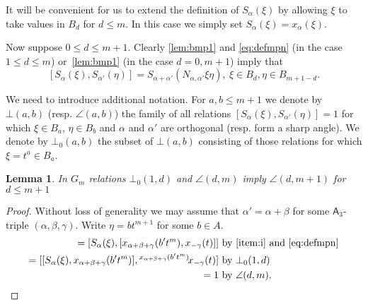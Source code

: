 \documentclass[oneside, 10pt]{amsart}
\newcommand{\rA}{\mathsf{A}}
\numberwithin{equation}{section}
\newtheorem{lemma}{Lemma}
\numberwithin{lemma}{section}
\theoremstyle{definition}
\theoremstyle{remark}
\begin{document}
It will be convenient for us to extend the definition of $S_\alpha(\xi)$ by allowing $\xi$ to take values in $B_d$ for $d\leq m$.
In this case we simply set $S_\alpha(\xi) = x_\alpha(\xi)$.

Now suppose  $0 \leq d \leq m+1$. Clearly \eqref{lem:bmp1} and \eqref{eq:defmpn} (in the case $1\leq d\leq m$) or~\cref{lem:bmp1} (in the case $d=0,m+1$) imply that
\begin{equation} \label{eq:verify-bmp1'} 
[S_\alpha(\xi), S_{\alpha'}(\eta)] = S_{\alpha+\alpha'}(N_{\alpha,\alpha'}\xi \eta),\ \xi \in B_d, \eta \in B_{m+1-d}.
\end{equation}

We need to introduce additional notation.
For $a,b\leq m+1$ we denote by $\bot(a, b)$ (resp. $\angle(a,b)$) the family of all relations $[S_\alpha(\xi), S_{\alpha'}(\eta)] = 1$
for which $\xi \in B_a$, $\eta \in B_b$ and $\alpha$ and $\alpha'$ are orthogonal (resp. form a sharp angle). 
We denote by $\bot_0(a, b)$ the subset of $\bot(a, b)$
consisting of those relations for which $\xi = t^{a} \in B_a$.

\begin{lemma} \label{claim1} In $G_m$ relations $\bot_0(1, d)$ and $\angle(d, m)$ imply $\angle(d, m+1)$ for $d\leq m+1$ \end{lemma}
\begin{proof}
Without loss of generality we may assume that $\alpha' = \alpha + \beta$
  for some $\rA_3$-triple $(\alpha, \beta, \gamma)$.
Write $\eta = bt^{m+1}$ for some $b\in A$.
\begin{align*} 
[S_\alpha(\xi), S_{\alpha+\beta}(bt^{m+1})] = [S_\alpha(\xi), [x_{\alpha+\beta+\gamma}(b't^m), x_{-\gamma}(t)]] & \text{ by~\eqref{item:i} and~\eqref{eq:defmpn}}\\
= [[S_\alpha(\xi), x_{\alpha+\beta+\gamma}(b't^m)], {}^{x_{\alpha+\beta+\gamma}(b't^m)}\!x_{-\gamma}(t)] & \text{ by~$\bot_0(1, d)$}\\
= 1
 & \text{ by~$\angle(d, m)$. \qedhere} \end{align*} 
\end{proof}
\end{document}
